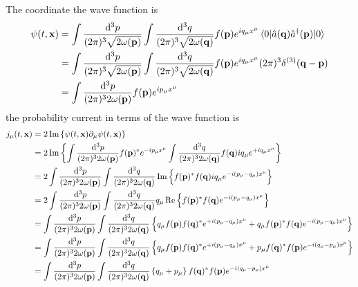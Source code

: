 The coordinate the wave function is
\begin{equation}
	\begin{split}
		\psi(t,\vb{x})
		&=
		\int\frac{\dd[3]{p}}{(2\pi)^3\sqrt{2\omega(\vb{p})}}
		\int\frac{\dd[3]{q}}{(2\pi)^3\sqrt{2\omega(\vb{q})}}
		f(\vb{p})e^{iq_\mu x^\mu}
		\expval{\hat{a}(\vb{q})\hat{a}^\dagger(\vb{p})}{0}
		\\
		&=
		\int\frac{\dd[3]{p}}{(2\pi)^3\sqrt{2\omega(\vb{p})}}
		\int\frac{\dd[3]{q}}{(2\pi)^3\sqrt{2\omega(\vb{q})}}
		f(\vb{p})e^{iq_\mu x^\mu}
		(2\pi)^3\delta^{(3)}(\vb{q}-\vb{p})
		\\
		&=
		\int\frac{\dd[3]{p}}{(2\pi)^32\omega(\vb{p})}
		f(\vb{p})e^{ip_\mu x^\mu}
	\end{split}
\end{equation}
the probability current in terms of the wave function is
\begin{equation}
	\begin{split}
		j_\mu(t,\vb{x})
		&=
		2
		\operatorname{\operatorname{Im}}\left\{
			\psi(t,\vb{x})
			\partial_\mu
			\psi(t,\vb{x})
		\right\}
		\\
		&=
		2
		\operatorname{\operatorname{Im}}\left\{
			\int\frac{\dd[3]{p}}{(2\pi)^32\omega(\vb{p})}
			f(\vb{p})^*e^{-ip_\mu x^\mu}
			\int\frac{\dd[3]{q}}{(2\pi)^32\omega(\vb{q})}
			f(\vb{q})iq_\mu e^{+iq_\mu x^\mu}
		\right\}
		\\
		&=
		2
		\int\frac{\dd[3]{p}}{(2\pi)^32\omega(\vb{p})}
		\int\frac{\dd[3]{q}}{(2\pi)^32\omega(\vb{q})}
		\operatorname{\operatorname{Im}}\left\{
			f(\vb{p})^*
			f(\vb{q})
			iq_\mu
			e^{-i(p_\mu-q_\mu)x^\mu}
		\right\}
		\\
		&=
		2
		\int\frac{\dd[3]{p}}{(2\pi)^32\omega(\vb{p})}
		\int\frac{\dd[3]{q}}{(2\pi)^32\omega(\vb{q})}
		q_\mu
		\operatorname{\operatorname{Re}}\left\{
			f(\vb{p})^*
			f(\vb{q})
			e^{-i(p_\mu-q_\mu)x^\mu}
		\right\}
		\\
		&=
		\int\frac{\dd[3]{p}}{(2\pi)^32\omega(\vb{p})}
		\int\frac{\dd[3]{q}}{(2\pi)^32\omega(\vb{q})}
		\left\{
			q_\mu
			f(\vb{p})
			f(\vb{q})^*
			e^{+i(p_\mu-q_\mu)x^\mu}
			+
			q_\mu
			f(\vb{p})^*
			f(\vb{q})
			e^{-i(p_\mu-q_\mu)x^\mu}
		\right\}
		\\
		&=
		\int\frac{\dd[3]{p}}{(2\pi)^32\omega(\vb{p})}
		\int\frac{\dd[3]{q}}{(2\pi)^32\omega(\vb{q})}
		\left\{
			q_\mu
			f(\vb{p})
			f(\vb{q})^*
			e^{+i(p_\mu-q_\mu)x^\mu}
			+
			p_\mu
			f(\vb{q})^*
			f(\vb{p})
			e^{-i(q_\mu-p_\mu)x^\mu}
		\right\}
		\\
		&=
		\int\frac{\dd[3]{p}}{(2\pi)^32\omega(\vb{p})}
		\int\frac{\dd[3]{q}}{(2\pi)^32\omega(\vb{q})}
		\left\{
			q_\mu
			+
			p_\mu
		\right\}
		f(\vb{q})^*
		f(\vb{p})
		e^{-i(q_\mu-p_\mu)x^\mu}
	\end{split}
\end{equation}

